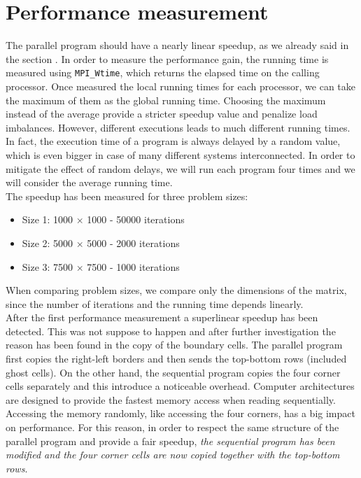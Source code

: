 \documentclass{article}
\begin{document}
\section{Performance measurement}
The parallel program should have a nearly linear speedup, as we already said in the section . In order to measure the performance gain, the running time is measured using \texttt{MPI\_Wtime}, which returns the elapsed time on the calling processor. Once measured the local running times for each processor, we can take the maximum of them as the global running time. Choosing the maximum instead of the average provide a stricter speedup value and penalize load imbalances. However, different executions leads to much different running times. In fact, the execution time of a program is always delayed by a random value, which is even bigger in case of many different systems interconnected. In order to mitigate the effect of random delays, we will run each program four times and we will consider the average running time. \\
The speedup has been measured for three problem sizes:
\begin{itemize}
    \item Size 1: 1000 $\times$ 1000 - 50000 iterations
    \item Size 2: 5000 $\times$ 5000 - 2000 iterations
    \item Size 3: 7500 $\times$ 7500 - 1000 iterations
\end{itemize}
When comparing problem sizes, we compare only the dimensions of the matrix, since the number of iterations and the running time depends linearly. \\
After the first performance measurement a superlinear speedup has been detected. This was not suppose to happen and after further investigation the reason has been found in the copy of the boundary cells. The parallel program first copies the right-left borders and then sends the top-bottom rows (included ghost cells). On the other hand, the sequential program copies the four corner cells separately and this introduce a noticeable overhead. Computer architectures are designed to provide the fastest memory access when reading sequentially. Accessing the memory randomly, like accessing the four corners, has a big impact on performance. For this reason, in order to respect the same structure of the parallel program and provide a fair speedup, \emph{the sequential program has been modified and the four corner cells are now copied together with the top-bottom rows}. \\
\end{document}
